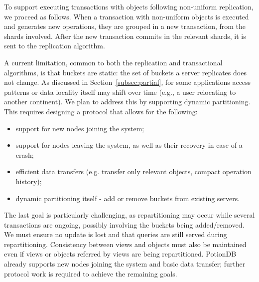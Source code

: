To support executing transactions with objects following non-uniform replication, we proceed as follows.
When a transaction with non-uniform objects is executed and generates new operations, they are grouped in a new transaction, from the shards involved.
After the new transaction commits in the relevant shards, it is sent to the replication algorithm.


A current limitation, common to both the replication and transactional algorithms, is that buckets are static: the set of buckets a server replicates does not change.
As discussed in Section~\ref{subsec:partial}, for some applications access patterns or data locality itself may shift over time (e.g., a user relocating to another continent).
We plan to address this by supporting dynamic partitioning.
This requires designing a protocol that allows for the following:

\begin{itemize}
	\item support for new nodes joining the system;
	\item support for nodes leaving the system, as well as their recovery in case of a crash;
	\item efficient data transfers (e.g. transfer only relevant objects, compact operation history);
	\item dynamic partitioning itself - add or remove buckets from existing servers.
\end{itemize}

The last goal is particularly challenging, as repartitioning may occur while several transactions are ongoing, possibly involving the buckets being added/removed.
We must ensure no update is lost and that queries are still served during repartitioning.
Consistency between views and objects must also be maintained even if views or objects referred by views are being repartitioned.
PotionDB already supports new nodes joining the system and basic data transfer; further protocol work is required to achieve the remaining goals.

